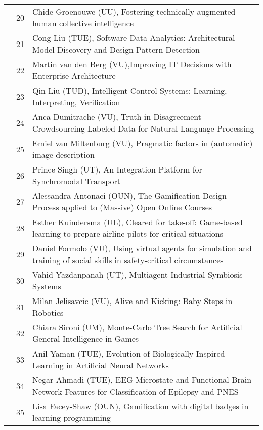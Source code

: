 \begin{longtabu}{@{}l@{ }l@{\hspace{1em}}X}
	&	 20	&	 Chide Groenouwe (UU), Fostering technically augmented human collective intelligence \\
	&	 21	&	 Cong Liu (TUE), Software Data Analytics: Architectural Model Discovery and Design Pattern Detection \\
	&	 22	&	 Martin van den Berg (VU),Improving IT Decisions with Enterprise Architecture \\
	&	 23	&	 Qin Liu (TUD), Intelligent Control Systems: Learning, Interpreting, Verification\\
	&	 24	&	 Anca Dumitrache (VU),  Truth in Disagreement - Crowdsourcing Labeled Data for Natural Language Processing\\
	&	 25	&	 Emiel van Miltenburg (VU), Pragmatic factors in (automatic) image description \\
	&	 26	&	 Prince Singh (UT), An Integration Platform for Synchromodal Transport \\
	&	 27	&	 Alessandra Antonaci (OUN), The Gamification Design Process applied to (Massive) Open Online Courses\\
	&	 28	&	 Esther Kuindersma (UL), Cleared for take-off: Game-based learning to prepare airline pilots for critical situations \\
	&	 29	&	 Daniel Formolo (VU), Using virtual agents for simulation and training of social skills in safety-critical circumstances \\

    &    30 &    Vahid Yazdanpanah (UT), Multiagent Industrial Symbiosis Systems \\

    &    31 &    Milan Jelisavcic (VU), Alive and Kicking: Baby Steps in Robotics \\

    &    32 &    Chiara Sironi (UM), Monte-Carlo Tree Search for Artificial General Intelligence in Games \\

    &    33 &    Anil Yaman (TUE), Evolution of Biologically Inspired Learning in Artificial Neural Networks \\

    &    34 &    Negar Ahmadi (TUE), EEG Microstate and Functional Brain Network Features for Classification of Epilepsy
    and PNES  \\

    &    35 & Lisa Facey-Shaw (OUN), Gamification with digital badges in learning programming \\


\end{longtabu}
